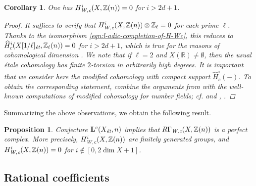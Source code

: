 \documentclass[leqno,12pt]{article}
\theoremstyle{plain}
\newtheorem{corollary}[theorem]{\indent\sc Corollary}
\newtheorem{proposition}[theorem]{\indent\sc Proposition}
\theoremstyle{definition}
\newcommand{\RR}{\mathbb{R}}
\newcommand{\ZZ}{\mathbb{Z}}
\newcommand{\Wc}{\text{\it W,c}}
\newcommand{\et}{\text{\it \'{e}t}}
\begin{document}
\begin{corollary}
  One has $H^i_\Wc (X, \ZZ(n)) = 0$ for $i > 2d+1$.

  \begin{proof}
    It suffices to verify that $H^i_\Wc (X, \ZZ(n)) \otimes \ZZ_\ell = 0$
    for each prime $\ell$. Thanks to the isomorphism
    \eqref{eqn:l-adic-completion-of-H-Wc}, this reduces to
    $\widehat{H}_c^i (X [1/\ell]_\et, \ZZ_\ell (n)) = 0$ for $i > 2d+1$,
    which is true for the reasons of cohomological dimension
    \cite[Expos\'{e}~X, Th\'{e}or\`{e}me~6.2]{SGA4}. We note that if $\ell = 2$ and
    $X (\RR) \ne \emptyset$, then the usual \'{e}tale cohomology has finite
    $2$-torsion in arbitrarily high degrees. It is important that we consider
    here the \emph{modified} cohomology with compact support
    $\widehat{H}_c^i (-)$. To obtain the corresponding statement, combine the
    arguments from \cite[Expos\'{e}~X]{SGA4} with the well-known computations of
    modified cohomology for number fields; cf. \cite[Chapter~II]{Milne-ADT} and
    \cite{Artin-Verdier-1964}, \cite{Mazur-1973}.
  \end{proof}
\end{corollary}

Summarizing the above observations, we obtain the following result.

\begin{proposition}
  \label{prop:RGammaWc-perfect}
  Conjecture $\mathbf{L}^c (X_\et,n)$ implies that $R\Gamma_\Wc (X, \ZZ(n))$
  is a perfect complex. More precisely, $H^i_\Wc (X, \ZZ(n))$ are finitely
  generated groups, and $H^i_\Wc (X, \ZZ(n)) = 0$ for
  $i \notin [0, 2\dim X + 1]$.
\end{proposition}

\subsection*{Rational coefficients}
\end{document}
